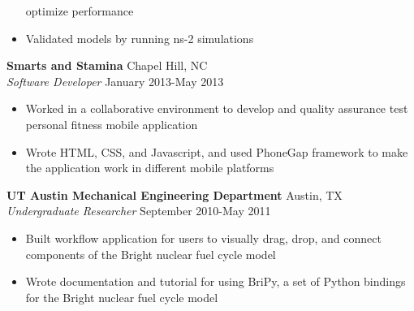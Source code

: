 \documentclass[line,margin,letterpaper]{res}
\begin{document}
\begin{resume}
\begin{itemize}
    optimize performance
    \item Validated models by running ns-2 simulations
  \end{itemize}
  {\bf Smarts and Stamina} \hfill Chapel Hill, NC \\
  \emph{Software Developer} \hfill January 2013-May 2013
  \begin{itemize} \itemsep -2pt
    \item Worked in a collaborative environment to develop and quality 
    assurance test personal fitness mobile application
    \item Wrote HTML, CSS, and Javascript, and used PhoneGap framework to make 
    the application work in different mobile platforms
  \end{itemize}
  {\bf UT Austin Mechanical Engineering Department} \hfill Austin, TX \\
  \emph{Undergraduate Researcher} \hfill September 2010-May 2011
  \begin{itemize} \itemsep -2pt
    \item Built workflow application for users to visually drag, drop, and 
    connect components of the Bright nuclear fuel cycle model
    \item Wrote documentation and tutorial for using BriPy, a set of Python
    bindings for the Bright nuclear fuel cycle model
  \end{itemize}

\end{resume}
\end{document}

